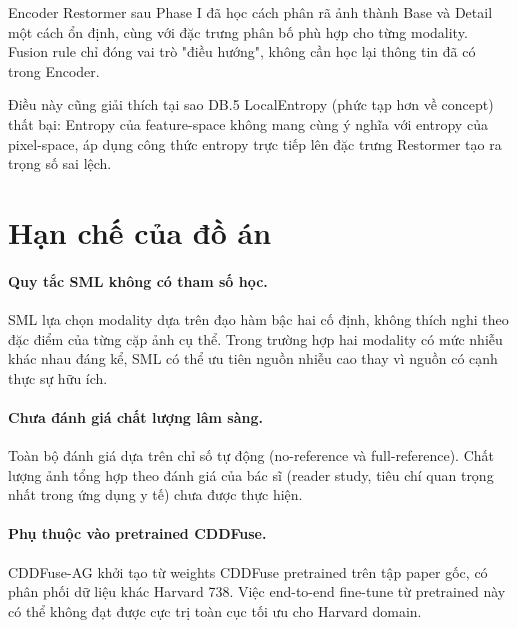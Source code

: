 Encoder Restormer sau Phase I đã học cách phân rã ảnh thành Base và Detail một cách ổn định, cùng với đặc trưng phân bố phù hợp cho từng modality. Fusion rule chỉ đóng vai trò "điều hướng", không cần học lại thông tin đã có trong Encoder.

Điều này cũng giải thích tại sao DB.5 LocalEntropy (phức tạp hơn về concept) thất bại: Entropy của feature-space không mang cùng ý nghĩa với entropy của pixel-space, áp dụng công thức entropy trực tiếp lên đặc trưng Restormer tạo ra trọng số sai lệch.

\section{Hạn chế của đồ án}
\label{sec:disc-limitations}

\paragraph{Quy tắc SML không có tham số học.}
SML lựa chọn modality dựa trên đạo hàm bậc hai cố định, không thích nghi theo đặc điểm của từng cặp ảnh cụ thể. Trong trường hợp hai modality có mức nhiễu khác nhau đáng kể, SML có thể ưu tiên nguồn nhiễu cao thay vì nguồn có cạnh thực sự hữu ích.

\paragraph{Chưa đánh giá chất lượng lâm sàng.}
Toàn bộ đánh giá dựa trên chỉ số tự động (no-reference và full-reference). Chất lượng ảnh tổng hợp theo đánh giá của bác sĩ (reader study, tiêu chí quan trọng nhất trong ứng dụng y tế) chưa được thực hiện.

\paragraph{Phụ thuộc vào pretrained CDDFuse.}
CDDFuse-AG khởi tạo từ weights CDDFuse pretrained trên tập paper gốc, có phân phối dữ liệu khác Harvard 738. Việc end-to-end fine-tune từ pretrained này có thể không đạt được cực trị toàn cục tối ưu cho Harvard domain.
